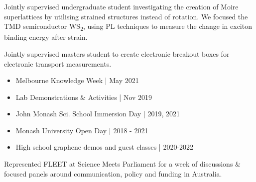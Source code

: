 \documentclass[10pt,a4paper,ragged2e,withhyper]{altacv}
\begin{document}
			\divider
				
			
				Jointly supervised undergraduate student investigating the creation of Moire superlattices by utilising strained structures instead of rotation. We focused the TMD semiconductor WS\textsubscript{2}, using PL techniques to measure the change in exciton binding energy after strain.
			
				\divider
				
				Jointly supervised masters student to create electronic breakout boxes for electronic transport measurements.
				
			\divider
			\newpage
			\vspace{-1em}
			\begin{multicols}{2}
			\begin{itemize}
				\item Melbourne Knowledge Week | May 2021
				\item Lab Demonstrations \& Activities | Nov 2019
				\item John Monash Sci. School Immersion Day | 2019, 2021
				\item Monash University Open Day | 2018 - 2021
				\item High school graphene demos and guest classes | 2020-2022
			\end{itemize}
			\end{multicols}
			
		

		\vspace{-1em}
		
		Represented FLEET at Science Meets Parliament for a week of discussions \& focused panels around communication, policy and funding in Australia.
		
		\divider
		
\end{document}
